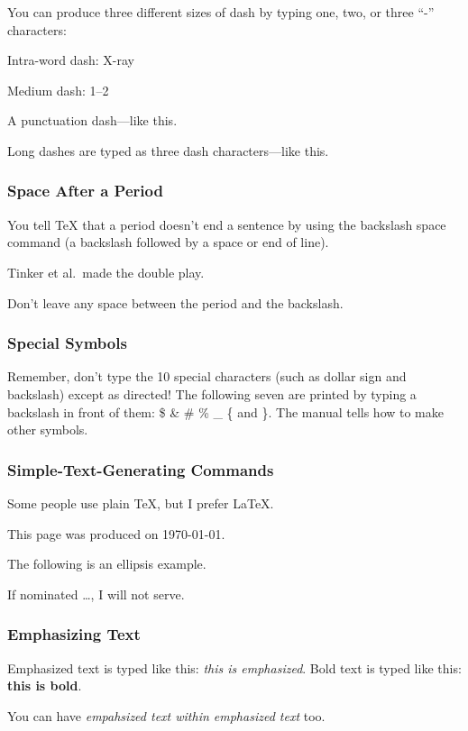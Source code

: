 \documentclass[twocolumn]{article}        %
\begin{document}
You can produce three different sizes of dash by typing one, two, or three ``-'' characters:

Intra-word dash: X-ray

Medium dash: 1--2

A punctuation dash---like this.

Long dashes are typed as three dash characters---like this.

\subsubsection*{Space After a Period}

You tell TeX that a period doesn't end a sentence by using the backslash space command (a backslash followed by a space or end of line).

Tinker et al.\ made the double play.

Don't leave any space between the period and the backslash.

\subsubsection*{Special Symbols}

Remember, don't type the 10 special characters (such as dollar sign and
backslash) except as directed!  The following seven are printed by
typing a backslash in front of them:  \$  \&  \#  \%  \_  \{  and  \}.
The manual tells how to make other symbols.

\subsubsection*{Simple-Text-Generating Commands}

Some people use plain \TeX, but I prefer \LaTeX.

This page was produced on \today.

The following is an ellipsis example.

If nominated \ldots, I will not serve.

\subsubsection*{Emphasizing Text}

Emphasized text is typed like this: \emph{this is emphasized}.
Bold       text is typed like this: \textbf{this is bold}.

You can have \emph{empahsized text \emph{within} emphasized text} too.
\end{document}
